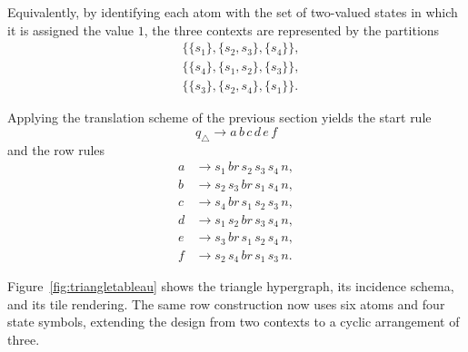 \documentclass[
  10pt,
  twocolumn,
  aps,
  pra,
  showkeys,
  amsmath,amssymb,
  longbibliography
]{revtex4-2}
\begin{document}
Equivalently, by identifying each atom with the set of two-valued states in which it is assigned the value \(1\), the three contexts are represented by the partitions
\begin{equation}
\begin{aligned}
&\{\{s_1\},\{s_2,s_3\},\{s_4\}\},\\
&\{\{s_4\},\{s_1,s_2\},\{s_3\}\},\\
&\{\{s_3\},\{s_2,s_4\},\{s_1\}\}.
\end{aligned}
\end{equation}

Applying the translation scheme of the previous section yields the start rule
\begin{equation}
q_{\triangle}\to a\,b\,c\,d\,e\,f
\end{equation}
and the row rules
\begin{align}
a &\to s_1\,br\,s_2\,s_3\,s_4\,n,
\nonumber\\
b &\to s_2\,s_3\,br\,s_1\,s_4\,n,
\nonumber\\
c &\to s_4\,br\,s_1\,s_2\,s_3\,n,
\nonumber\\
d &\to s_1\,s_2\,br\,s_3\,s_4\,n,
\nonumber\\
e &\to s_3\,br\,s_1\,s_2\,s_4\,n,
\nonumber\\
f &\to s_2\,s_4\,br\,s_1\,s_3\,n.
\label{eq:trianglegrammar}
\end{align}

Figure~\ref{fig:triangletableau} shows the triangle hypergraph, its incidence schema, and its tile rendering. The same row construction now uses six atoms and four state symbols, extending the design from two contexts to a cyclic arrangement of three.
\end{document}
